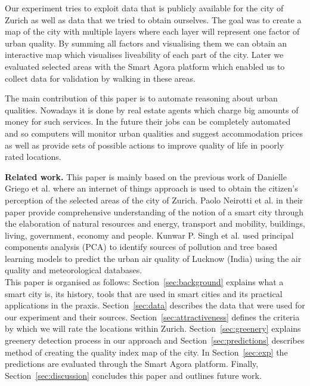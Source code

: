 \documentclass[letterpaper]{article}
\newcommand{\mypar}[1]{{\bf #1.}}
\begin{document}
\indent Our experiment tries to exploit data that is publicly available for the city of Zurich as well as data that we tried to obtain ourselves.
The goal was to create a map of the city with multiple layers where each layer will represent one factor of urban quality. By summing all factors and
visualising them we can obtain an interactive map which visualises liveability of each part of the city. Later we evaluated selected areas with the Smart
Agora platform which enabled us to collect data for validation by walking in these areas.

\indent The main contribution of this paper is to automate reasoning about urban qualities. Nowadays it is done by
real estate agents which charge big amounts of money for such services. In the future their jobs can be
completely automated and so computers will monitor urban qualities and suggest accommodation prices as well as
provide sets of possible actions to improve quality of life in poorly rated locations.

\mypar{Related work} This paper is mainly based on the previous work of Danielle Griego et al. \cite{smartCities}
where an internet of things approach is used to obtain the citizen's perception of the selected areas of the city of Zurich.
Paolo Neirotti et al. \cite{smartCities2} in their paper provide comprehensive understanding of the notion of a smart city
through the elaboration of natural resources and energy, transport and mobility, buildings, living, government, economy
and people. Kunwar P. Singh et al. \cite{pollution} used principal components analysis (PCA) to identify sources
of pollution and tree based learning models to predict the urban air quality of Lucknow (India) using the air quality
and meteorological databases.
\\
\indent This paper is organised as follows: Section~\ref{sec:background} explains what a smart city is, its history, tools that are used
in smart cities and its practical applications in the praxis. Section~\ref{sec:data} describes the data that were used for our
experiment and their sources. Section~\ref{sec:attractiveness} defines the criteria by which we will rate the locations within Zurich.
Section~\ref{sec:greenery} explains greenery detection process in our approach and Section~\ref{sec:predictions} describes method of creating the quality index
map of the city. In Section~\ref{sec:exp} the predictions are evaluated through the Smart Agora platform. Finally, Section~\ref{sec:discussion} concludes this
paper and outlines future work.
\end{document}
